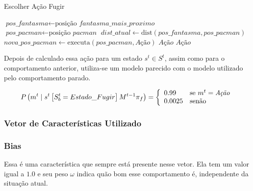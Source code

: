 \begin{algorithm}[h]
	\caption{Escolher Ação Fugir} \label{algorithm:SelecaoDeAcaoFugir}
	\begin{algorithmic}[1]
			\State $\textit{pos\_fantasma} \gets \text{posição }\textit{fantasma\_mais\_proximo} $
			\State $\textit{pos\_pacman} \gets \text{posição }\textit{pacman} $
			\State $\textit{dist\_atual} \gets \text{dist} \left( \textit{pos\_fantasma}, \textit{pos\_pacman} \right) $
				\State $\textit{nova\_pos\_pacman} \gets \text{executa} \left( \textit{pos\_pacman}, \textit{Ação} \right) $
					\State \Return $ \textit{Ação} $
				\EndIf 
			\EndFor
			\State \Return $ \textit{Ação} $
		\EndProcedure
	\end{algorithmic}
\end{algorithm}

Depois de calculado essa ação para um estado $ s^t \in S^t $, assim como para o comportamento anterior, utiliza-se um modelo parecido com o modelo utilizado pelo comportamento parado.

\begin{equation}
    P \left( m^t \mid s^t \left[ S_b^t = Estado\_Fugir \right] M^{t-1} \pi_f \right) = 
        \left\{
            \begin{array}{l l}
                0.99 & \text{se }m^t = \textit{Ação} \\
                0.0025 & \text{senão}
            \end{array}
        \right.
\end{equation}

\subsubsection{Vetor de Características Utilizado} \label{subsubsection:3ComportamentosVetorCaracterísticas}

\subsubsection*{Bias}

Essa é uma característica que sempre está presente nesse vetor. Ela tem um valor igual a $ 1.0 $ e seu peso $ \omega $ indica quão bom esse comportamento é, independente da situação atual.

